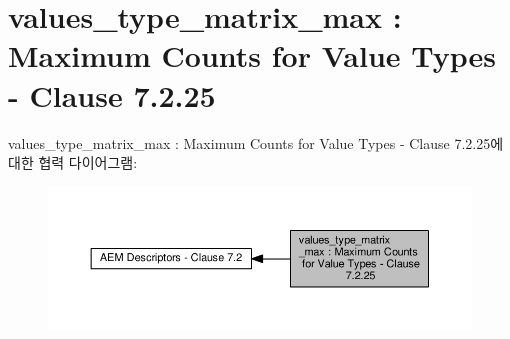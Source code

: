 \hypertarget{group__values__type__matrix__max}{}\section{values\+\_\+type\+\_\+matrix\+\_\+max \+: Maximum Counts for Value Types -\/ Clause 7.2.25}
\label{group__values__type__matrix__max}
values\+\_\+type\+\_\+matrix\+\_\+max \+: Maximum Counts for Value Types -\/ Clause 7.2.25에 대한 협력 다이어그램\+:
\nopagebreak
\begin{figure}[H]
\begin{center}
\leavevmode
\includegraphics[width=350pt]{group__values__type__matrix__max}
\end{center}
\end{figure}
